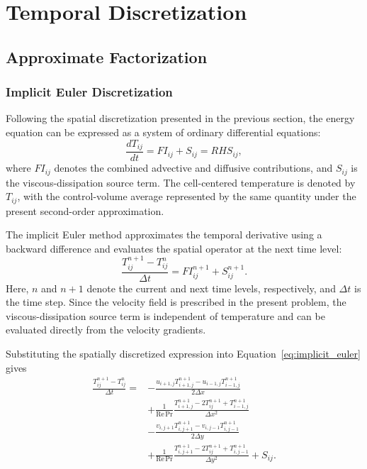 \section{Temporal Discretization}
\label{sec:temporal_discretization}

\subsection{Approximate Factorization}
\label{subsec:approximate_factorization}

\subsubsection{Implicit Euler Discretization}

Following the spatial discretization presented in the previous
section, the energy equation can be expressed as a system of
ordinary differential equations:
\begin{equation}
\frac{dT_{ij}}{dt}=FI_{ij}+S_{ij}=RHS_{ij},
\label{eq:semi_discrete_energy}
\end{equation}
where $FI_{ij}$ denotes the combined advective and diffusive
contributions, and $S_{ij}$ is the viscous-dissipation source
term. The cell-centered temperature is denoted by $T_{ij}$,
with the control-volume average represented by the same quantity
under the present second-order approximation.

The implicit Euler method approximates the temporal derivative
using a backward difference and evaluates the spatial operator
at the next time level:
\begin{equation}
\frac{T_{ij}^{n+1}-T_{ij}^{n}}{\Delta t}
=
FI_{ij}^{n+1}+S_{ij}^{n+1}.
\label{eq:implicit_euler}
\end{equation}
Here, $n$ and $n+1$ denote the current and next time levels,
respectively, and $\Delta t$ is the time step. Since the
velocity field is prescribed in the present problem, the
viscous-dissipation source term is independent of temperature
and can be evaluated directly from the velocity gradients.

Substituting the spatially discretized expression into
Equation~\eqref{eq:implicit_euler} gives
\begin{equation}
\begin{aligned}
\frac{T_{ij}^{n+1}-T_{ij}^{n}}{\Delta t}
={}&
-\frac{
u_{i+1,j}T_{i+1,j}^{n+1}
-u_{i-1,j}T_{i-1,j}^{n+1}
}{2\Delta x}
\\[0.15cm]
&+
\frac{1}{\mathrm{Re}\,\mathrm{Pr}}
\frac{
T_{i+1,j}^{n+1}-2T_{ij}^{n+1}
+T_{i-1,j}^{n+1}
}{\Delta x^2}
\\[0.15cm]
&-
\frac{
v_{i,j+1}T_{i,j+1}^{n+1}
-v_{i,j-1}T_{i,j-1}^{n+1}
}{2\Delta y}
\\[0.15cm]
&+
\frac{1}{\mathrm{Re}\,\mathrm{Pr}}
\frac{
T_{i,j+1}^{n+1}-2T_{ij}^{n+1}
+T_{i,j-1}^{n+1}
}{\Delta y^2}
+S_{ij}.
\end{aligned}
\label{eq:implicit_euler_expanded}
\end{equation}

